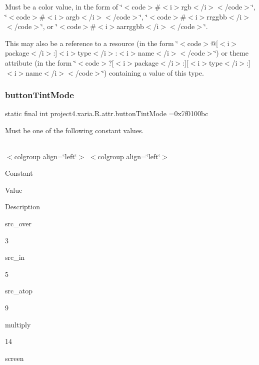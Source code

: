 Must be a color value, in the form of \char`\"{}$<$code$>$\#$<$i$>$rgb$<$/i$>$$<$/code$>$\char`\"{}, \char`\"{}$<$code$>$\#$<$i$>$argb$<$/i$>$$<$/code$>$\char`\"{}, \char`\"{}$<$code$>$\#$<$i$>$rrggbb$<$/i$>$$<$/code$>$\char`\"{}, or \char`\"{}$<$code$>$\#$<$i$>$aarrggbb$<$/i$>$$<$/code$>$\char`\"{}. 

This may also be a reference to a resource (in the form \char`\"{}$<$code$>$@\mbox{[}$<$i$>$package$<$/i$>$\+:\mbox{]}$<$i$>$type$<$/i$>$\+:$<$i$>$name$<$/i$>$$<$/code$>$\char`\"{}) or theme attribute (in the form \char`\"{}$<$code$>$?\mbox{[}$<$i$>$package$<$/i$>$\+:\mbox{]}\mbox{[}$<$i$>$type$<$/i$>$\+:\mbox{]}$<$i$>$name$<$/i$>$$<$/code$>$\char`\"{}) containing a value of this type. \mbox{\label{classproject4_1_1xaria_1_1R_1_1attr_aa6f5c404a1e2fa114a0873395ae394f3}} 
\subsubsection{\texorpdfstring{button\+Tint\+Mode}{buttonTintMode}}
{\footnotesize\ttfamily static final int project4.\+xaria.\+R.\+attr.\+button\+Tint\+Mode =0x7f0100bc\hspace{0.3cm}{\ttfamily [static]}}

Must be one of the following constant values.

\tabulinesep=1mm
\begin{longtabu} spread 0pt [c]{*{0}{|X[-1]}|}
\hline
\end{longtabu}
$<$colgroup align=\char`\"{}left\char`\"{}$>$ $<$colgroup align=\char`\"{}left\char`\"{}$>$ 

Constant

Value

Description 

{\ttfamily src\+\_\+over}

3

{\ttfamily src\+\_\+in}

5

{\ttfamily src\+\_\+atop}

9

{\ttfamily multiply}

14

{\ttfamily screen}

